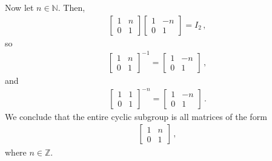 \documentclass{article}
\begin{document}
Now let $n \in \mathbb{N}$. Then,
\begin{align*}
    \begin{bmatrix}
        1&n\\0&1
    \end{bmatrix}
    \begin{bmatrix}
        1&-n\\
        0&1
    \end{bmatrix} = I_2 \,,
\end{align*}
so
\begin{align*}
    \begin{bmatrix}
        1&n\\
        0&1
    \end{bmatrix}^{-1} = \begin{bmatrix}
        1&-n\\
        0&1
    \end{bmatrix} \,,
\end{align*}
and
\begin{align*}
    \begin{bmatrix}
        1&1\\
        0&1
    \end{bmatrix}^{-n} = \begin{bmatrix}
        1&-n\\
        0&1
    \end{bmatrix} \,.
\end{align*}
We conclude that the entire cyclic subgroup is all matrices of the form
\begin{align*}
    \begin{bmatrix}
        1&n\\
        0&1
    \end{bmatrix} \,,
\end{align*}
where $n \in \mathbb{Z}$.
\end{document}
